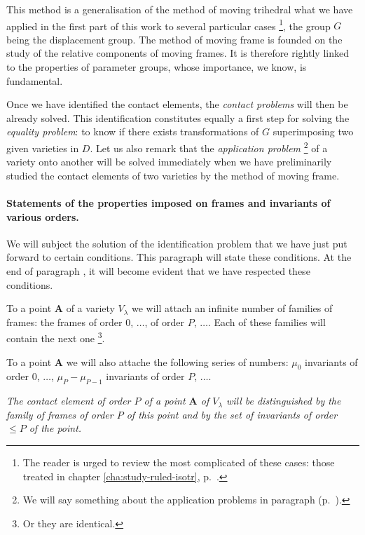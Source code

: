 This method is a generalisation of the method of moving trihedral what we have applied in the first part of this work to several particular cases \footnote{The reader is urged to review the most complicated of these cases: those treated in chapter \ref{cha:study-ruled-isotr}, p.~\pageref{cha:study-ruled-isotr}.}, the group $G$ being the displacement group. The method of moving frame is founded on the study of the relative components of moving frames. It is therefore rightly linked to the properties of parameter groups, whose importance, we know, is fundamental.

Once we have identified the contact elements, the \emph{contact problems} will then be already solved. This identification constitutes equally a first step for solving the \emph{equality problem}: to know if there exists transformations of $G$ superimposing two given varieties in $D$. Let us also remark that the \emph{application problem} \footnote{We will say something about the application problems in paragraph  (p.~\pageref{sec:196}).} of a variety onto another will be solved immediately when we have preliminarily studied the contact elements of two varieties by the method of moving frame.

\paragraph{Statements of the properties imposed on frames and invariants of various orders.}
\label{sec:127}
We will subject the solution of the identification problem that we have just put forward to certain conditions. This paragraph will state these conditions. At the end of paragraph , it will become evident that we have respected these conditions.

To a point $\mathbf{A}$ of a variety $V_{\lambda}$ we will attach an infinite number of families of frames: the frames of order $0$, $\dots$, of order $P$, $\dots$. Each of these families will contain the next one \footnote{Or they are identical.}.

To a point $\mathbf{A}$ we will also attache the following series of numbers: $\mu_{0}$ invariants of order $0$, $\dots$, $\mu_{P}-\mu_{P-1}$ invariants of order $P$, $\dots$.

\somespace

\emph{The contact element of order $P$ of a point $\mathbf{A}$ of $V_{\lambda}$ will be distinguished by the family of frames of order $P$ of this point and by the set of invariants of order $\le P$ of the point.}

